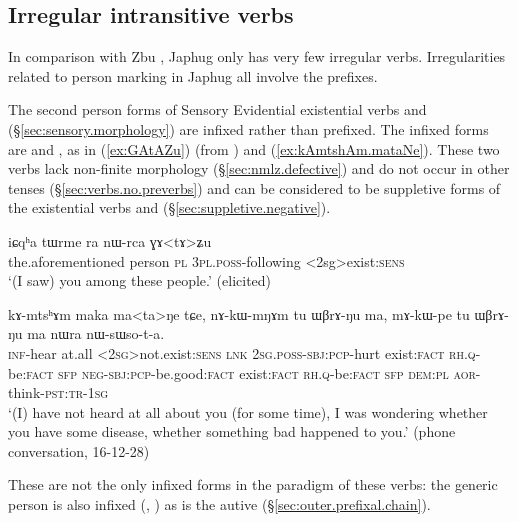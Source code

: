 \subsection{Irregular intransitive verbs} \label{sec:intr.person.irregular}
In comparison with Zbu \citep{gong18these}, Japhug only has very few irregular verbs. Irregularities related to person marking in Japhug all involve the prefixes.

The second person forms of Sensory Evidential existential verbs  and  (§\ref{sec:sensory.morphology}) are infixed rather than prefixed. The infixed forms are  and , as in (\ref{ex:GAtAZu}) (from \citealt[91]{jacques12agreement}) and  (\ref{ex:kAmtshAm.mataNe}). These two verbs lack non-finite morphology (§\ref{sec:nmlz.defective}) and do not occur in other tenses (§\ref{sec:verbs.no.preverbs}) and can be considered to be suppletive forms of the existential verbs  and  (§\ref{sec:suppletive.negative}).

\begin{exe}
\ex \label{ex:GAtAZu}
\gll iɕqʰa tɯrme ra nɯ-rca ɣɤ<tɤ>ʑu \\
the.aforementioned person \textsc{pl} \textsc{3pl}.\textsc{poss}-following <2sg>exist:\textsc{sens} \\
\glt `(I saw) you among these people.' (elicited)
\end{exe}

\begin{exe}
\ex \label{ex:kAmtshAm.mataNe}
\gll kɤ-mtsʰɤm maka ma<ta>ŋe tɕe, nɤ-kɯ-mŋɤm tu ɯβrɤ-ŋu ma, mɤ-kɯ-pe tu ɯβrɤ-ŋu ma nɯra nɯ-sɯso-t-a. \\
\textsc{inf}-hear at.all <\textsc{2sg}>not.exist:\textsc{sens} \textsc{lnk} \textsc{2sg}.\textsc{poss}-\textsc{sbj}:\textsc{pcp}-hurt exist:\textsc{fact} \textsc{rh}.\textsc{q}-be:\textsc{fact} \textsc{sfp}  \textsc{neg}-\textsc{sbj}:\textsc{pcp}-be.good:\textsc{fact} exist:\textsc{fact} \textsc{rh}.\textsc{q}-be:\textsc{fact} \textsc{sfp} \textsc{dem}:\textsc{pl} \textsc{aor}-think-\textsc{pst}:\textsc{tr}-\textsc{1sg} \\
\glt `(I) have not heard at all about you (for some time), I was wondering whether you have some disease, whether something bad happened to you.' (phone conversation, 16-12-28)
\end{exe}

These are not the only infixed forms in the paradigm of these verbs: the generic person  is also infixed (, ) as is the autive  (§\ref{sec:outer.prefixal.chain}).

